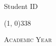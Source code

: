 \begin{titlepage}
\begin{center}
\begin{normalsize}
            \vspace{-48pt}
            
            \begin{flushright}
                \textit{\graduateTitle}\\
                \myName\\
                Student ID \myStudentID
            \end{flushright}
        \end{normalsize}

        \vspace*{\fill}
        
        \line(1, 0){338} \\
        \begin{normalsize}
            \textsc{Academic Year \myAA}
        \end{normalsize}
    \end{center}
\end{titlepage}
